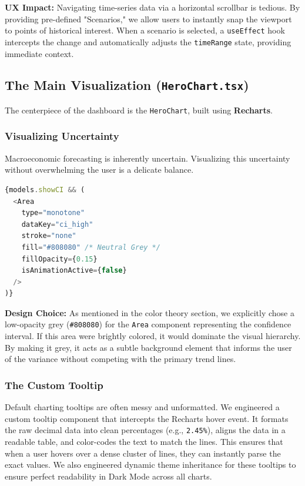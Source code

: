 \documentclass[12pt]{article}
\begin{document}
\textbf{UX Impact:} Navigating time-series data via a horizontal scrollbar is tedious. By providing pre-defined "Scenarios," we allow users to instantly snap the viewport to points of historical interest. When a scenario is selected, a \texttt{useEffect} hook intercepts the change and automatically adjusts the \texttt{timeRange} state, providing immediate context.

\subsection{The Main Visualization (\texttt{HeroChart.tsx})}
The centerpiece of the dashboard is the \texttt{HeroChart}, built using \textbf{Recharts}. 

\subsubsection{Visualizing Uncertainty}
Macroeconomic forecasting is inherently uncertain. Visualizing this uncertainty without overwhelming the user is a delicate balance.

\begin{lstlisting}[language=JavaScript, caption=Rendering the Confidence Interval]
{models.showCI && (
  <Area
    type="monotone"
    dataKey="ci_high"
    stroke="none"
    fill="#808080" /* Neutral Grey */
    fillOpacity={0.15}
    isAnimationActive={false}
  />
)}
\end{lstlisting}

\textbf{Design Choice:} As mentioned in the color theory section, we explicitly chose a low-opacity grey (\texttt{\#808080}) for the \texttt{Area} component representing the confidence interval. If this area were brightly colored, it would dominate the visual hierarchy. By making it grey, it acts as a subtle background element that informs the user of the variance without competing with the primary trend lines.

\subsubsection{The Custom Tooltip}
Default charting tooltips are often messy and unformatted. We engineered a custom tooltip component that intercepts the Recharts hover event. It formats the raw decimal data into clean percentages (e.g., \texttt{2.45\%}), aligns the data in a readable table, and color-codes the text to match the lines. This ensures that when a user hovers over a dense cluster of lines, they can instantly parse the exact values. We also engineered dynamic theme inheritance for these tooltips to ensure perfect readability in Dark Mode across all charts.
\end{document}
